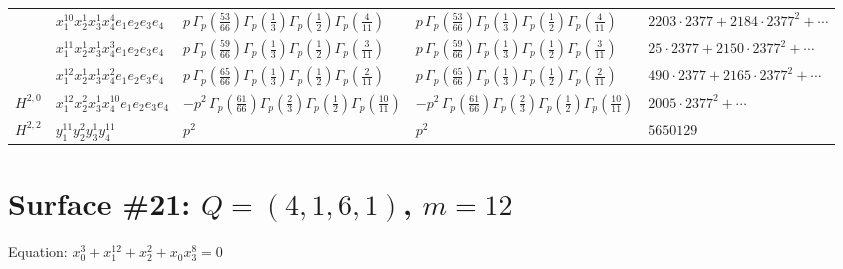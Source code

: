 \documentclass[11pt]{article}
\begin{document}
\begin{table}[ht]
{\begin{tabular}{@{}lllll@{}}
 & $x_{1}^{10} x_{2}^{1} x_{3}^{1} x_{4}^{4}  e_{1} e_{2} e_{3} e_{4}$ & $p \, \Gamma_p \left( \frac{53}{66} \right) \Gamma_p \left( \frac{1}{3} \right) \Gamma_p \left( \frac{1}{2} \right) \Gamma_p \left( \frac{4}{11} \right)$ & $p \, \Gamma_p \left( \frac{53}{66} \right) \Gamma_p \left( \frac{1}{3} \right) \Gamma_p \left( \frac{1}{2} \right) \Gamma_p \left( \frac{4}{11} \right)$ & $2203{\cdot}2377{+}2184{\cdot}2377^{2}{+}\cdots$ \\
 & $x_{1}^{11} x_{2}^{1} x_{3}^{1} x_{4}^{3}  e_{1} e_{2} e_{3} e_{4}$ & $p \, \Gamma_p \left( \frac{59}{66} \right) \Gamma_p \left( \frac{1}{3} \right) \Gamma_p \left( \frac{1}{2} \right) \Gamma_p \left( \frac{3}{11} \right)$ & $p \, \Gamma_p \left( \frac{59}{66} \right) \Gamma_p \left( \frac{1}{3} \right) \Gamma_p \left( \frac{1}{2} \right) \Gamma_p \left( \frac{3}{11} \right)$ & $25{\cdot}2377{+}2150{\cdot}2377^{2}{+}\cdots$ \\
 & $x_{1}^{12} x_{2}^{1} x_{3}^{1} x_{4}^{2}  e_{1} e_{2} e_{3} e_{4}$ & $p \, \Gamma_p \left( \frac{65}{66} \right) \Gamma_p \left( \frac{1}{3} \right) \Gamma_p \left( \frac{1}{2} \right) \Gamma_p \left( \frac{2}{11} \right)$ & $p \, \Gamma_p \left( \frac{65}{66} \right) \Gamma_p \left( \frac{1}{3} \right) \Gamma_p \left( \frac{1}{2} \right) \Gamma_p \left( \frac{2}{11} \right)$ & $490{\cdot}2377{+}2165{\cdot}2377^{2}{+}\cdots$ \\
\midrule
$H^{2,0}$ & $x_{1}^{12} x_{2}^{2} x_{3}^{1} x_{4}^{10}  e_{1} e_{2} e_{3} e_{4}$ & $- p^{2} \, \Gamma_p \left( \frac{61}{66} \right) \Gamma_p \left( \frac{2}{3} \right) \Gamma_p \left( \frac{1}{2} \right) \Gamma_p \left( \frac{10}{11} \right)$ & $- p^{2} \, \Gamma_p \left( \frac{61}{66} \right) \Gamma_p \left( \frac{2}{3} \right) \Gamma_p \left( \frac{1}{2} \right) \Gamma_p \left( \frac{10}{11} \right)$ & $2005{\cdot}2377^{2}{+}\cdots$ \\
\midrule
$H^{2,2}$ & $y_{1}^{11} y_{2}^{2} y_{3}^{1} y_{4}^{11}$ & $p^{2} \,$ & $p^{2} \,$ & $5650129$ \\
\bottomrule
\end{tabular}
}
\renewcommand{\arraystretch}{1.0}
\end{table}

\newpage

\section*{Surface \#21: $Q=(4, 1, 6, 1)$, $m=12$}

Equation: $x_0^{3} + x_1^{12} + x_2^{2} + x_0 x_3^{8} = 0$
\end{document}
